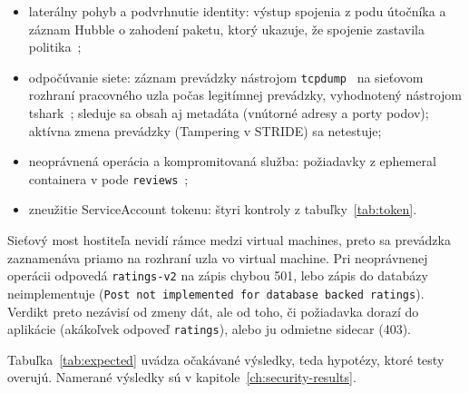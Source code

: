 \begin{itemize}
  \item laterálny pohyb a podvrhnutie identity: výstup spojenia z podu útočníka a záznam Hubble o zahodení paketu, ktorý ukazuje, že spojenie zastavila politika~\cite{hubble};
  \item odpočúvanie siete: záznam prevádzky nástrojom \texttt{tcpdump}~\cite{tcpdump} na sieťovom rozhraní pracovného uzla počas legitímnej prevádzky, vyhodnotený nástrojom tshark~\cite{wireshark}; sleduje sa obsah aj metadáta (vnútorné adresy a porty podov); aktívna zmena prevádzky (Tampering v STRIDE) sa netestuje;
  \item neoprávnená operácia a kompromitovaná služba: požiadavky z ephemeral containera v pode \texttt{reviews}~\cite{k8s-ephemeral-containers};
  \item zneužitie ServiceAccount tokenu: štyri kontroly z tabuľky~\ref{tab:token}.
\end{itemize}

Sieťový most hostiteľa nevidí rámce medzi virtual machines, preto sa prevádzka zaznamenáva priamo na rozhraní uzla vo virtual machine. Pri neoprávnenej operácii odpovedá \texttt{ratings-v2} na zápis chybou 501, lebo zápis do databázy neimplementuje (\texttt{Post not implemented for database backed ratings}). Verdikt preto nezávisí od zmeny dát, ale od toho, či požiadavka dorazí do aplikácie (akákoľvek odpoveď \texttt{ratings}), alebo ju odmietne sidecar (403).

Tabuľka~\ref{tab:expected} uvádza očakávané výsledky, teda hypotézy, ktoré testy overujú. Namerané výsledky sú v kapitole~\ref{ch:security-results}.

